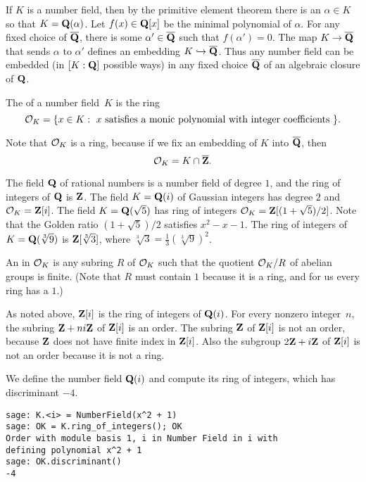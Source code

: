 If $K$ is a number field, then by the primitive
element theorem there is an $\alpha \in K$ so that $K = \mathbf{Q}(\alpha)$.
Let $f(x) \in \mathbf{Q}[x]$ be the minimal polynomial of $\alpha$.
For any fixed choice of $\overline{\mathbf{Q}}$, there is some $\alpha'\in\overline{\mathbf{Q}}$
such that $f(\alpha')=0$.  The map $K\to \overline{\mathbf{Q}}$
that sends $\alpha$ to $\alpha'$ defines an embedding $K\hookrightarrow \overline{\mathbf{Q}}$.
Thus any number field can be embedded (in $[K:\mathbf{Q}]$ possible ways) 
in any fixed choice $\overline{\mathbf{Q}}$ of an algebraic closure of $\mathbf{Q}$.

\begin{definition}
The  of a number field~$K$ is the ring 
$$
  \mathcal{O}_K = \{x \in K : \text{ $x$ satisfies a monic polynomial with integer coefficients }\}.
$$
\end{definition}
Note that $\mathcal{O}_K$ is a ring, because 
if we fix an embedding of $K$ into $\overline{\mathbf{Q}}$, then
$$
  \mathcal{O}_K = K \cap \overline{\mathbf{Z}}.
$$


The field $\mathbf{Q}$ of rational numbers is a number field of degree $1$,
and the ring of integers of $\mathbf{Q}$ is $\mathbf{Z}$.  The field $K=\mathbf{Q}(i)$ of
Gaussian integers has degree $2$ and $\mathcal{O}_K = \mathbf{Z}[i]$.  The field
$K=\mathbf{Q}(\sqrt{5})$ has ring of integers $\mathcal{O}_K = \mathbf{Z}[(1+\sqrt{5})/2]$.
Note that the Golden ratio $(1+\sqrt{5})/2$ satisfies $x^2-x-1$.
The ring of integers of $K=\mathbf{Q}(\sqrt[3]{9})$ is
$\mathbf{Z}[\sqrt[3]{3}]$, where $\sqrt[3]{3}=\frac{1}{3}(\sqrt[3]{9})^2$.

\begin{definition}[Order]\label{defn:order}
An  in $\mathcal{O}_K$ is any subring $R$ of $\mathcal{O}_K$ such that the
quotient $\mathcal{O}_K/R$ of abelian groups is finite.  
(Note that $R$ must contain $1$ because it is a ring, and for us
every ring has a $1$.)
\end{definition}
As noted above, $\mathbf{Z}[i]$ is the ring of integers of $\mathbf{Q}(i)$.  For every
nonzero integer~$n$, the subring $\mathbf{Z}+ni\mathbf{Z}$ of $\mathbf{Z}[i]$ is an order.
The subring $\mathbf{Z}$ of $\mathbf{Z}[i]$ is not an order, because $\mathbf{Z}$ does not
have finite index in $\mathbf{Z}[i]$.  Also the subgroup $2\mathbf{Z} + i\mathbf{Z}$ of
$\mathbf{Z}[i]$ is not an order because it is not a ring.  

We define the number field $\mathbf{Q}(i)$ and compute its
ring of integers, which has discriminant $-4$.
\begin{verbatim}
sage: K.<i> = NumberField(x^2 + 1)
sage: OK = K.ring_of_integers(); OK
Order with module basis 1, i in Number Field in i with 
defining polynomial x^2 + 1
sage: OK.discriminant()
-4
\end{verbatim}%

